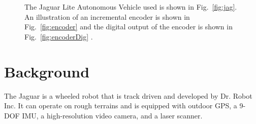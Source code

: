\documentclass[conference]{../IEEEtran}
\begin{document}
\begin{figure}[t]
  \centering
  \hspace{0.5cm}
  \caption{The Jaguar Lite Autonomous Vehicle used is shown in Fig.~\ref{fig:jag}.
           An illustration of an incremental encoder is shown in Fig.~\ref{fig:encoder}
           and the digital output of the encoder is shown in Fig.~\ref{fig:encoderDig}
           \cite{jag, encoders, detector}.}

\end{figure}

\section{Background}
The Jaguar is a wheeled robot that is track driven and developed by Dr. Robot Inc. It  can
operate on rough terrains and is equipped with outdoor GPS, a 9-DOF IMU, a high-resolution
video camera, and a laser scanner.
\end{document}
